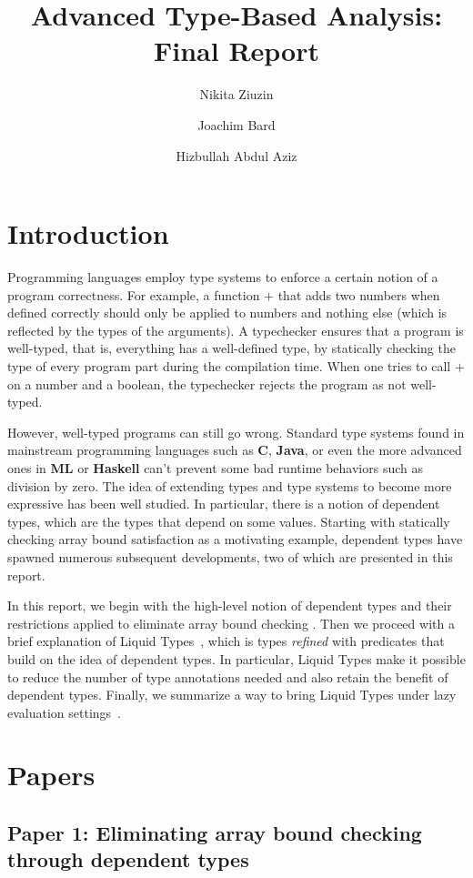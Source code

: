 \documentclass[a4paper,UKenglish]{lipics-v2016}
\title{Advanced Type-Based Analysis: Final Report}
\author[1]{Nikita Ziuzin}
\author[2]{Joachim Bard}
\author[3]{Hizbullah Abdul Aziz}
\affil[1]{\texttt{nzyuzin93@gmail.com}}
\affil[2]{\texttt{s9jobard@stud.uni-saarland.de}}
\affil[3]{\texttt{s8hijabb@stud.uni-saarland.de}}
\begin{document}
\maketitle


\section{Introduction}

Programming languages employ type systems to enforce a certain notion of a
program correctness. For example, a function $+$ that adds two numbers when
defined correctly should only be applied to numbers and nothing else (which
is reflected by the types of the arguments). A typechecker ensures that a
program is well-typed, that is, everything has a well-defined type, by
statically checking the type of every program part during the compilation
time.  When one tries to call $+$ on a number and a boolean, the typechecker
rejects the program as not well-typed.

However, well-typed programs can still go wrong. Standard type systems found
in mainstream programming languages such as \textbf{C}, \textbf{Java}, or
even the more advanced ones in \textbf{ML} or \textbf{Haskell} can't prevent
some bad runtime behaviors such as division by zero. The idea of extending
types and type systems to become more expressive has been well studied. In
particular, there is a notion of dependent types, which are the types that
depend on some values. Starting with statically checking array bound
satisfaction as a motivating example, dependent types have spawned numerous
subsequent developments, two of which are presented in this report.

In this report, we begin with the high-level notion of dependent types and
their restrictions applied to eliminate array bound checking
\cite{Xi:1998:EAB}. Then we proceed with a brief explanation of Liquid
Types~\cite{Rondon:2008:LT}, which is types \emph{refined} with predicates that
build on the idea of dependent types. In particular, Liquid Types make it
possible to reduce the number of type annotations needed and also retain the
benefit of dependent types.  Finally, we summarize a way to bring Liquid Types
under lazy evaluation settings~\cite{Vazou:ICFP:2014}.

\section{Papers}

\subsection{Paper 1: Eliminating array bound checking through dependent types}
\end{document}
